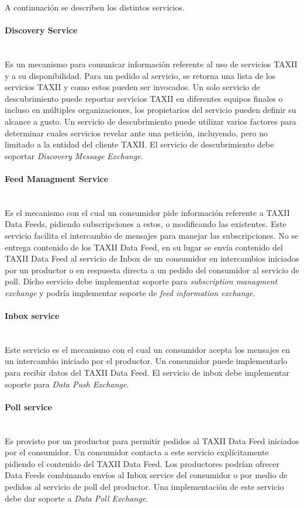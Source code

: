 A continuación se describen los distintos servicios.

\paragraph{Discovery Service}\ \\

Es un mecanismo para comunicar información referente al uso de servicios TAXII y 
a su disponibilidad. Para un pedido al servicio, se retorna una lista de los 
servicios TAXII y como estos pueden ser invocados. Un solo servicio de 
descubrimiento puede reportar servicios TAXII en diferentes equipos finales o 
incluso en múltiples organizaciones, los propietarios del servicio pueden 
definir su alcance a gusto. Un servicio de descubrimiento puede utilizar 
varios factores para determinar cuales servicios revelar ante una petición, 
incluyendo, pero no limitado a la entidad del cliente TAXII.
El servicio de descubrimiento debe soportar \textit{Discovery Message Exchange}.

\paragraph{Feed Managment Service}\ \\

Es el mecanismo con el cual un consumidor pide información referente a TAXII 
Data Feeds, pidiendo subscripciones a estos, o modificando las existentes. Este 
servicio facilita el intercambio de mensajes para manejar las subscripciones. 
No se entrega contenido de los TAXII Data Feed, en su lugar se envía 
contenido del TAXII Data Feed al servicio de Inbox de un consumidor en intercambios 
iniciados por un productor o en respuesta directa a un pedido del consumidor al 
servicio de poll.
Dicho servicio debe implementar soporte para \textit{subscription managment exchange} y podría implementar soporte de \textit{feed information exchange}.

\paragraph{Inbox service}\ \\
Este servicio es el mecanismo con el cual un consumidor acepta los mensajes en 
un intercambio iniciado por el productor. Un consumidor puede implementarlo 
para recibir datos del TAXII Data Feed.
El servicio de inbox debe implementar soporte para \textit{Data Push Exchange}.

\paragraph{Poll service}\ \\
Es provisto por un productor para permitir pedidos al TAXII Data Feed iniciados 
por  el consumidor. Un consumidor contacta a este servicio explícitamente 
pidiendo el contenido del TAXII Data Feed. Los productores podrían ofrecer Data 
Feeds combinando envíos al Inbox service del consumidor o por medio de pedidos 
al servicio de poll del productor.
Una implementación de este servicio debe dar soporte a \textit{Data Poll Exchange}.

